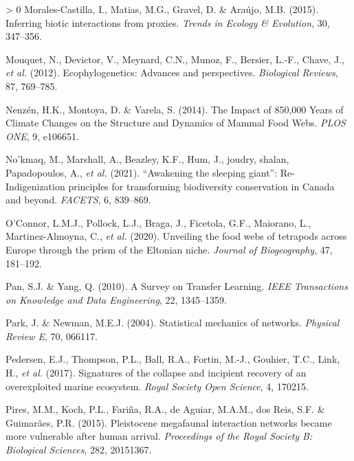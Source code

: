 \documentclass[10pt,oneside]{article}
\newlength{\cslhangindent}
\newenvironment{CSLReferences}[3] %
 {%
  \setlength{\parindent}{0pt}
  \ifodd #1 \everypar{\setlength{\hangindent}{\cslhangindent}}\ignorespaces\fi
  \ifnum #2 > 0
  \setlength{\parskip}{#2\baselineskip}
  \fi
 }%
 {}
\begin{document}
\begin{CSLReferences}{1}{0}
\leavevmode\hypertarget{ref-Morales-Castilla2015InfBio}{}%
Morales-Castilla, I., Matias, M.G., Gravel, D. \& Araújo, M.B. (2015).
Inferring biotic interactions from proxies. \emph{Trends in Ecology \&
Evolution}, 30, 347--356.

\leavevmode\hypertarget{ref-Mouquet2012EcoAdv}{}%
Mouquet, N., Devictor, V., Meynard, C.N., Munoz, F., Bersier, L.-F.,
Chave, J., \emph{et al.} (2012). Ecophylogenetics: Advances and
perspectives. \emph{Biological Reviews}, 87, 769--785.

\leavevmode\hypertarget{ref-Nenzen2014Imp850}{}%
Nenzén, H.K., Montoya, D. \& Varela, S. (2014). The Impact of 850,000
Years of Climate Changes on the Structure and Dynamics of Mammal Food
Webs. \emph{PLOS ONE}, 9, e106651.

\leavevmode\hypertarget{ref-Nokmaq2021AwaSle}{}%
No'kmaq, M., Marshall, A., Beazley, K.F., Hum, J., joudry, shalan,
Papadopoulos, A., \emph{et al.} (2021). {``Awakening the sleeping
giant''}: Re-Indigenization principles for transforming biodiversity
conservation in Canada and beyond. \emph{FACETS}, 6, 839--869.

\leavevmode\hypertarget{ref-OConnor2020UnvFoo}{}%
O'Connor, L.M.J., Pollock, L.J., Braga, J., Ficetola, G.F., Maiorano,
L., Martinez-Almoyna, C., \emph{et al.} (2020). Unveiling the food webs
of tetrapods across Europe through the prism of the Eltonian niche.
\emph{Journal of Biogeography}, 47, 181--192.

\leavevmode\hypertarget{ref-Pan2010SurTra}{}%
Pan, S.J. \& Yang, Q. (2010). A Survey on Transfer Learning. \emph{IEEE
Transactions on Knowledge and Data Engineering}, 22, 1345--1359.

\leavevmode\hypertarget{ref-Park2004StaMec}{}%
Park, J. \& Newman, M.E.J. (2004). Statistical mechanics of networks.
\emph{Physical Review E}, 70, 066117.

\leavevmode\hypertarget{ref-Pedersen2017SigCol}{}%
Pedersen, E.J., Thompson, P.L., Ball, R.A., Fortin, M.-J., Gouhier,
T.C., Link, H., \emph{et al.} (2017). Signatures of the collapse and
incipient recovery of an overexploited marine ecosystem. \emph{Royal
Society Open Science}, 4, 170215.

\leavevmode\hypertarget{ref-Pires2015PleMeg}{}%
Pires, M.M., Koch, P.L., Fariña, R.A., de Aguiar, M.A.M., dos Reis, S.F.
\& Guimarães, P.R. (2015). Pleistocene megafaunal interaction networks
became more vulnerable after human arrival. \emph{Proceedings of the
Royal Society B: Biological Sciences}, 282, 20151367.


\end{CSLReferences}
\end{document}
